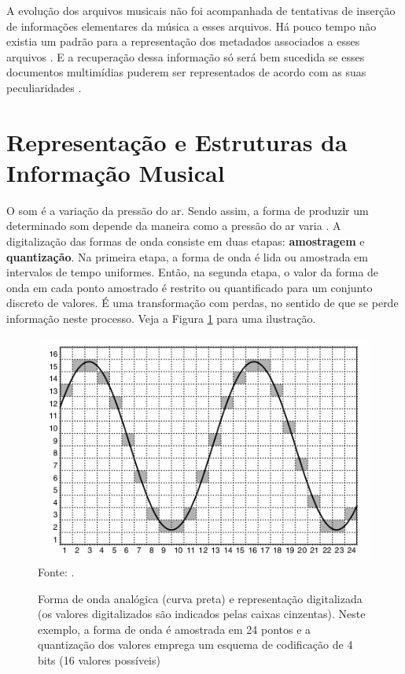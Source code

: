 A evolução dos arquivos musicais não foi acompanhada de tentativas de inserção de informações elementares da música a esses arquivos. Há pouco tempo não existia um padrão para a representação dos metadados associados a esses arquivos \cite{andrade&crispim2008}. E a recuperação dessa informação só será bem sucedida se esses documentos multimídias puderem ser representados de acordo com as suas peculiaridades \cite{gomes2015}.

\section{Representação e Estruturas da Informação Musical}

O som é a variação da pressão do ar. Sendo assim, a forma de produzir um determinado som depende da maneira como a pressão do ar varia \cite{miletto2004}. A digitalização das formas de onda consiste em duas etapas: \textbf{amostragem} e \textbf{quantização}. Na primeira etapa, a forma de onda é lida ou amostrada em intervalos de tempo uniformes. Então, na segunda etapa, o valor da forma de onda em cada ponto amostrado é restrito ou quantificado para um conjunto discreto de valores. É uma transformação com perdas, no sentido de que se perde informação neste processo. Veja a Figura \ref{fig:ondaAnalog} para uma ilustração.

\begin{figure}[!htb]
   \centering
   \caption{Forma de onda analógica (curva preta) e representação digitalizada (os valores digitalizados são indicados pelas caixas cinzentas). Neste exemplo, a forma de onda é amostrada em 24 pontos e a quantização dos valores emprega um esquema de codificação de 4 bits (16 valores possíveis)}\label{fig:ondaAnalog} 
   \includegraphics[scale=0.6]{figuras/ondaAnalog.png}
   Fonte: \cite{muller2007}.
\end{figure}

